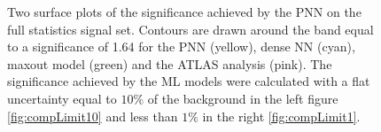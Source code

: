 \begin{figure}
    \caption[Two surface plots of the significance comparing sensitivity limits set by \ac{PNN}, dense \ac{NN}, maxout model
    and the \ac{ATLAS} analysis, where the models have assumed a flat uncertainty of $10\%$ and $<1\%$ respectively.]{Two surface plots 
    of the significance achieved by the \ac{PNN} on the full statistics signal set. Contours are drawn around the band equal to a 
    significance of 1.64 for the \ac{PNN} (yellow), dense \ac{NN} (cyan), maxout model (green) and the \ac{ATLAS} analysis (pink). The 
    significance achieved by the \ac{ML} models were calculated with a flat uncertainty equal to $10\%$ of the background in the left 
    figure \ref{fig:compLimit10} and less than $1\%$ in the right \ref{fig:compLimit1}.}
\end{figure}
